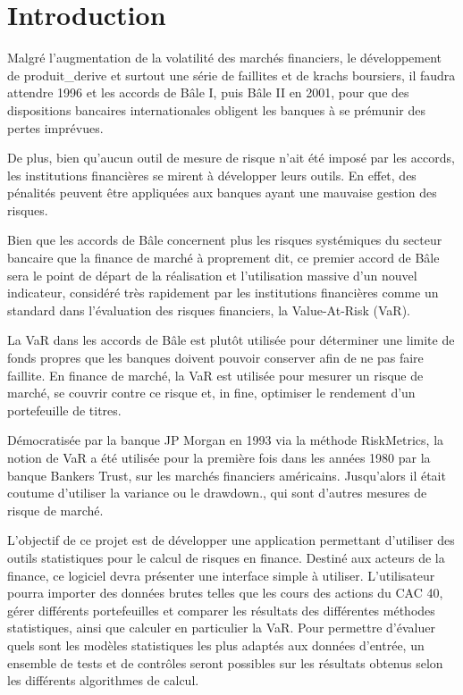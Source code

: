 \chapter{Introduction} 
	Malgré l’augmentation de la volatilité des marchés financiers, le développement de \gls{produit_derive} et surtout une série de faillites et de krachs boursiers, il faudra attendre 1996 et les accords de Bâle I, puis Bâle II en 2001, pour que des dispositions bancaires internationales obligent les banques à se prémunir des pertes imprévues. 

De plus, bien qu’aucun outil de mesure de risque n’ait été imposé par les accords, les institutions financières se mirent à développer leurs outils. En effet, des pénalités peuvent être appliquées aux banques ayant une mauvaise gestion des risques.

Bien que les accords de Bâle concernent plus les risques systémiques du secteur bancaire que la finance de marché à proprement dit, ce premier accord de Bâle sera le point de départ de la réalisation et l’utilisation massive d’un nouvel indicateur, considéré très rapidement par les institutions financières comme un standard dans l’évaluation des risques financiers, la Value-At-Risk (VaR).

La VaR dans les accords de Bâle est plutôt utilisée pour déterminer une limite de fonds propres que les banques doivent pouvoir conserver afin de ne pas faire faillite. En finance de marché, la VaR est utilisée pour mesurer un risque de marché, se couvrir contre ce risque et, in fine, optimiser le rendement d'un portefeuille de titres.

Démocratisée par la banque JP Morgan en 1993 via la méthode RiskMetrics, la notion de VaR a été utilisée pour la première fois dans les années 1980 par la banque Bankers Trust, sur les marchés financiers américains. Jusqu'alors il était coutume d'utiliser la variance ou le \gls{drawdown}., qui sont d'autres mesures de risque de marché.

L’objectif de ce projet est de développer une application permettant d’utiliser des outils statistiques pour le calcul de risques en finance. Destiné aux acteurs de la finance, ce logiciel devra présenter une interface simple à utiliser. L’utilisateur pourra importer des données brutes telles que les cours des actions du CAC 40, gérer différents portefeuilles et comparer les résultats des différentes méthodes statistiques, ainsi que calculer en particulier la VaR. Pour permettre d’évaluer quels sont les modèles statistiques les plus adaptés aux données d’entrée, un ensemble de tests et de contrôles seront possibles sur les résultats obtenus selon les différents algorithmes de calcul.

